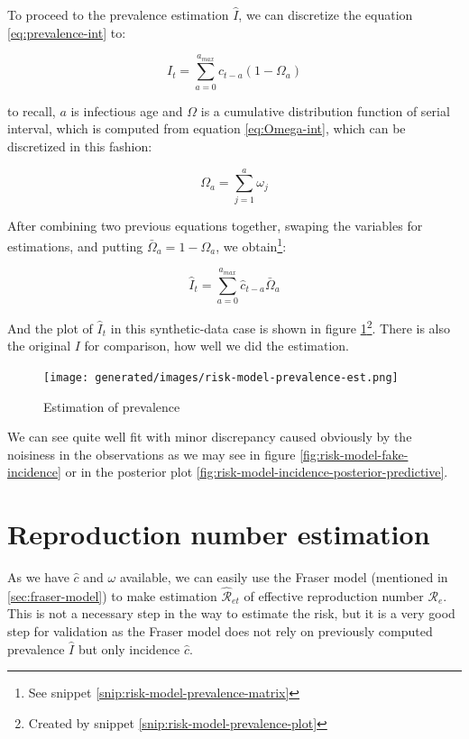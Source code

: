 \documentclass[
  digital, %
  oneside, %
  lof,     %
  lot,     %
]{fithesis4}
\begin{document}
To proceed to the prevalence estimation $\hat{I}$, we can discretize the equation \ref{eq:prevalence-int} to:

\begin{equation}\label{eq:prevalence-sum}
  I_t = \sum_{a=0}^{a_{max}} c_{t - a} (1 - \Omega_a)
\end{equation}

to recall, $a$ is infectious age and $\Omega$ is a cumulative distribution function of serial interval, which is computed from equation \ref{eq:Omega-int}, which can be discretized in this fashion:

\begin{equation}
  \Omega_a = \sum_{j = 1}^a \omega_j
\end{equation}

After combining two previous equations together, swaping the variables for estimations, and putting $\bar{\Omega}_a = 1 - \Omega_a$, we obtain\footnote{See snippet \ref{snip:risk-model-prevalence-matrix}}:

\begin{equation}\label{eq:prevalence-est}
  \hat{I}_t = \sum_{a=0}^{a_{max}} \hat{c}_{t - a} \bar{\Omega}_a
\end{equation}

And the plot of $\hat{I}_t$ in this synthetic-data case is shown in figure \ref{fig:risk-model-prevalence-est}\footnote{Created by snippet \ref{snip:risk-model-prevalence-plot}}.
There is also the original $I$ for comparison, how well we did the estimation.

\begin{figure}[H]
  \begin{center}
    \texttt{[image: generated/images/risk-model-prevalence-est.png]}
  \end{center}
  \caption{Estimation of prevalence}
  \label{fig:risk-model-prevalence-est}
\end{figure}

We can see quite well fit with minor discrepancy caused obviously by the noisiness in the observations as we may see in figure \ref{fig:risk-model-fake-incidence} or in the posterior plot \ref{fig:risk-model-incidence-posterior-predictive}.


\section{Reproduction number estimation}

As we have $\hat{c}$ and $\omega$ available, we can easily use the Fraser model (mentioned in \autoref{sec:fraser-model}) to make estimation $\hat{\mathcal{R}}_{et}$ of effective reproduction number $\mathcal{R}_e$.
This is not a necessary step in the way to estimate the risk, but it is a very good step for validation as the Fraser model does not rely on previously computed prevalence $\hat{I}$ but only incidence $\hat{c}$.
\end{document}
